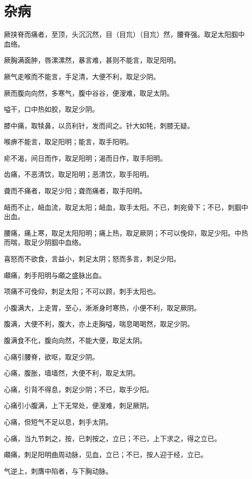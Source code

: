 \documentclass[12pt,UTF8]{ctexbook}
\begin{document}
	\chapter{杂病}
	
	厥挟脊而痛者，至顶，头沉沉然，目（目巟）（目巟）然，腰脊强。取足太阳腘中血络。
	
	厥胸满面肿，唇漯漯然，暴言难，甚则不能言，取足阳明。
	
	厥气走喉而不能言，手足清，大便不利，取足少阴。
	
	厥而腹向向然，多寒气，腹中谷谷，便溲难，取足太阴。
	
	嗌干，口中热如胶，取足少阴。
	
	膝中痛，取犊鼻，以员利针，发而间之。针大如牦，刺膝无疑。
	
	喉痹不能言，取足阳明；能言，取手阳明。
	
	疟不渴，间日而作，取足阳明；渴而日作，取手阳明。
	
	齿痛，不恶清饮，取足阳明；恶清饮，取手阳明。
	
	聋而不痛者，取足少阳；聋而痛者，取手阳明。
	
	衄而不止，衄血流，取足太阳；衄血，取手太阳。不已，刺宛骨下；不已，刺腘中出血。
	
	腰痛，痛上寒，取足太阳阳明；痛上热，取足厥阴；不可以俛仰，取足少阳。中热而喘，取足少阴腘中血络。
	
	喜怒而不欲食，言益小，刺足太阴；怒而多言，刺足少阳。
	
	顑痛，刺手阳明与顑之盛脉出血。
	
	项痛不可俛仰，刺足太阳；不可以顾，刺手太阳也。
	
	小腹满大，上走胃，至心，淅淅身时寒热，小便不利，取足厥阴。
	
	腹满，大便不利，腹大，亦上走胸嗌，喘息喝喝然，取足少阴。
	
	腹满食不化，腹向向然，不能大便，取足太阴。
	
	心痛引腰脊，欲呕，取足少阴。
	
	心痛，腹胀，墙墙然，大便不利，取足太阴。
	
	心痛，引背不得息，刺足少阴；不已，取手少阳。
	
	心痛引小腹满，上下无常处，便溲难，刺足厥阴。
	
	心痛，但短气不足以息，刺手太阴。
	
	心痛，当九节刺之，按，已刺按之，立已；不已，上下求之，得之立已。
	
	顑痛，刺足阳明曲周动脉，见血，立已；不已，按人迎于经，立已。
	
	气逆上，刺膺中陷者，与下胸动脉。
	
\end{document}
